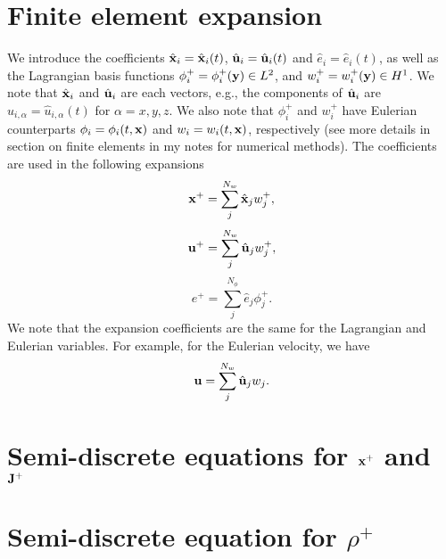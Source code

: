 \documentclass[11pt]{article}
\begin{document}
\section{Finite element expansion}
We introduce the coefficients $\hat{\mathbf{x}}_i = \hat{\mathbf{x}}_i(t)$, $\hat{\mathbf{u}}_i = \hat{\mathbf{u}}_i(t)$ and $\hat{e}_i = \hat{e}_i(t)$, as well as the Lagrangian basis functions $\phi^+_i = \phi^+_i(\mathbf{y}) \in L^2$, and $w^+_i = w^+_i(\mathbf{y}) \in H^1$. We note that $\hat{\mathbf{x}}_i$ and $\hat{\mathbf{u}}_i$ are each vectors, e.g., the components of $\hat{\mathbf{u}}_i$ are $\hat{u}_{i,\alpha} = \hat{u}_{i,\alpha}(t)$ for $\alpha = x,y,z$. We also note that $\phi^+_i$ and $w^+_i$ have Eulerian counterparts $\phi_i = \phi_i(t,\mathbf{x})$ and $w_i = w_i(t,\mathbf{x})$, respectively (see more details in section on finite elements in my notes for numerical methods). The coefficients are used in the following expansions
\begin{equation}
    \mathbf{x}^+ = \sum_j^{N_w} \hat{\mathbf{x}}_j w^+_j,
\end{equation}
\begin{equation}
    \mathbf{u}^+ = \sum_j^{N_w} \hat{\mathbf{u}}_j w^+_j,
\end{equation}
\begin{equation}
    e^+ = \sum_j^{N_\phi} \hat{e}_j \phi^+_j.
\end{equation}
We note that the expansion coefficients are the same for the Lagrangian and Eulerian variables. For example, for the Eulerian velocity, we have
\begin{equation}
    \mathbf{u} = \sum_j^{N_w} \hat{\mathbf{u}}_j w_j.
\end{equation}

\section{Semi-discrete equations for $\mathbf{x}^+$ and $\mathbf{J}^+$}

\section{Semi-discrete equation for $\rho^+$}
\end{document}

